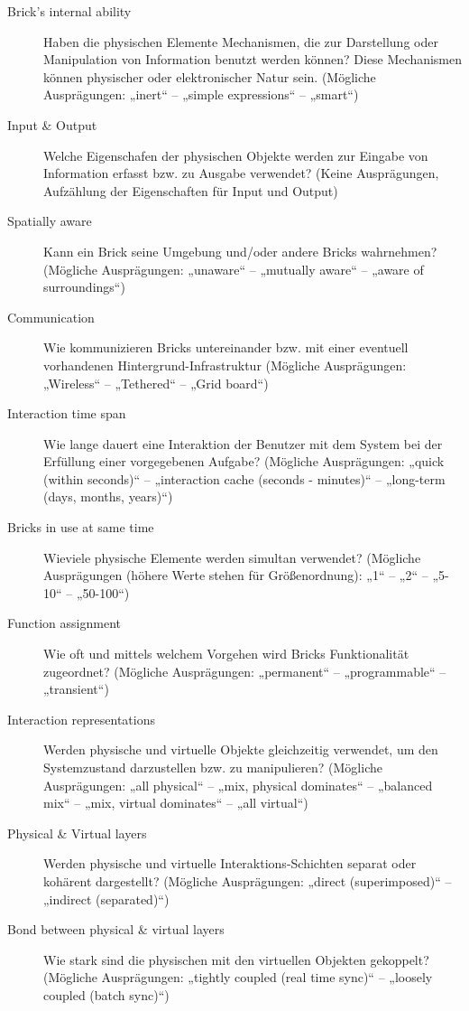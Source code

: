 \begin{description}
	\item[Brick's internal ability] Haben die physischen Elemente Mechanismen, die zur Darstellung oder Manipulation von Information benutzt werden können? Diese Mechanismen können physischer oder elektronischer Natur sein. (Mögliche Ausprägungen: „inert“ -- „simple expressions“ -- „smart“) 
	\item[Input \& Output] Welche Eigenschafen der physischen Objekte werden zur Eingabe von Information erfasst bzw. zu Ausgabe verwendet? (Keine Ausprägungen, Aufzählung der Eigenschaften für Input und Output)
	\item[Spatially aware] Kann ein Brick seine Umgebung und/oder andere Bricks wahrnehmen? (Mögliche Ausprägungen: „unaware“ -- „mutually aware“ -- „aware of surroundings“) 
	\item[Communication] Wie kommunizieren Bricks untereinander bzw. mit einer eventuell vorhandenen Hintergrund-Infrastruktur (Mögliche Ausprägungen: „Wireless“ -- „Tethered“ -- „Grid board“)
	\item[Interaction time span] Wie lange dauert eine Interaktion der Benutzer mit dem System bei der Erfüllung einer vorgegebenen Aufgabe? (Mögliche Ausprägungen: „quick (within seconds)“ -- „interaction cache (seconds - minutes)“ -- „long-term (days, months, years)“)
	\item[Bricks in use at same time] Wieviele physische Elemente werden simultan verwendet? (Mögliche Ausprägungen (höhere Werte stehen für Größenordnung): „1“ -- „2“ -- „5-10“ -- „50-100“)
	\item[Function assignment] Wie oft und mittels welchem Vorgehen wird Bricks Funktionalität zugeordnet? (Mögliche Ausprägungen: „permanent“ -- „programmable“ -- „transient“) 
	\item[Interaction representations] Werden physische und virtuelle Objekte gleichzeitig verwendet, um den Systemzustand darzustellen bzw. zu manipulieren? (Mögliche Ausprägungen: „all physical“ -- „mix, physical dominates“ -- „balanced mix“ -- „mix, virtual dominates“ -- „all virtual“)
	\item[Physical \& Virtual layers] Werden physische und virtuelle Interaktions-Schichten separat oder kohärent dargestellt? (Mögliche Ausprägungen: „direct (superimposed)“ -- „indirect (separated)“)
	\item[Bond between physical \& virtual layers] Wie stark sind die physischen mit den virtuellen Objekten gekoppelt? (Mögliche Ausprägungen: „tightly coupled (real time sync)“ -- „loosely coupled (batch sync)“)

\end{description}
